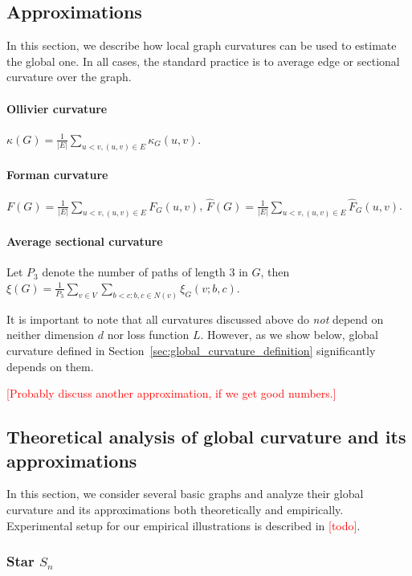 \documentclass{article} %
\begin{document}
\subsection{Approximations}

In this section, we describe how local graph curvatures can be used to estimate the global one. In all cases, the standard practice is to average edge or sectional curvature over the graph.

\paragraph{Ollivier curvature} $\kappa(G) = \frac{1}{|E|}\sum\limits_{u < v, (u,v) \in E} \kappa_G(u,v)$.

\paragraph{Forman curvature} $F(G) = \frac{1}{|E|}\sum\limits_{u < v, (u,v) \in E} F_G(u,v)$, $\hat F(G) = \frac{1}{|E|}\sum\limits_{u < v, (u,v) \in E} \hat F_G(u,v)$.

\paragraph{Average sectional curvature} Let $P_3$ denote the number of paths of length 3 in $G$, then $\xi(G) = \frac{1}{P_3} \sum\limits_{v \in V }\sum\limits_{b<c: b,c\in N(v)} \xi_G(v;b,c)$.

It is important to note that all curvatures discussed above do \textit{not} depend on neither dimension $d$ nor loss function $L$. However, as we show below, global curvature defined in Section~\ref{sec:global_curvature_definition} significantly depends on them.

\textcolor{red}{[Probably discuss another approximation, if we get good numbers.]}

\subsection{Theoretical analysis of global curvature and its approximations}

In this section, we consider several basic graphs and analyze their global curvature and its approximations both theoretically and empirically. Experimental setup for our empirical illustrations is described in \textcolor{red}{[todo]}.

\subsubsection{Star $S_n$}\label{sec:S_n}
\end{document}
